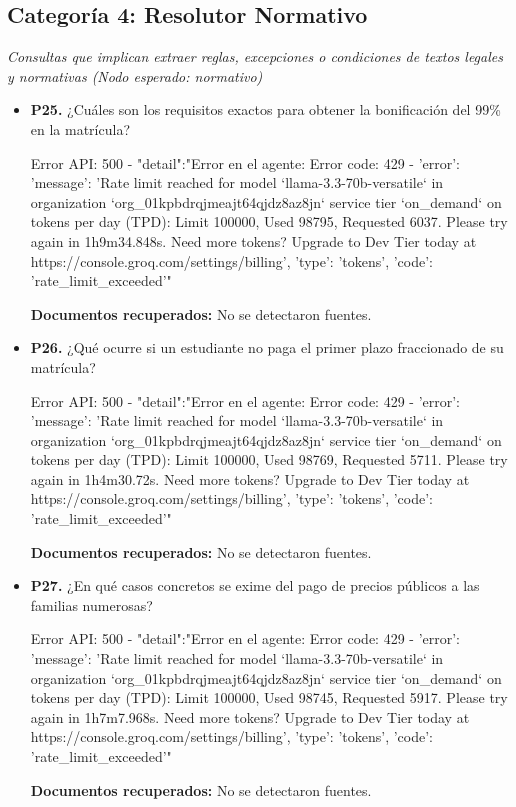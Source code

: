 \documentclass{article}
\begin{document}
\subsection{Categoría 4: Resolutor Normativo}
\textit{Consultas que implican extraer reglas, excepciones o condiciones de textos legales y normativas (Nodo esperado: normativo)}
\begin{itemize}
  \item \textbf{P25.} ¿Cuáles son los requisitos exactos para obtener la bonificación del 99\% en la matrícula? \\
    \begin{respuesta_agente}
      Error API: 500 - {"detail":"Error en el agente: Error code: 429 - {'error': {'message': 'Rate limit reached for model `llama-3.3-70b-versatile` in organization `org_01kpbdrqjmeajt64qjdz8az8jn` service tier `on_demand` on tokens per day (TPD): Limit 100000, Used 98795, Requested 6037. Please try again in 1h9m34.848s. Need more tokens? Upgrade to Dev Tier today at https://console.groq.com/settings/billing', 'type': 'tokens', 'code': 'rate_limit_exceeded'}}"}
    \end{respuesta_agente}
    \vspace{0.2cm}
    \noindent\textbf{Documentos recuperados:} No se detectaron fuentes.

  \item \textbf{P26.} ¿Qué ocurre si un estudiante no paga el primer plazo fraccionado de su matrícula? \\
    \begin{respuesta_agente}
      Error API: 500 - {"detail":"Error en el agente: Error code: 429 - {'error': {'message': 'Rate limit reached for model `llama-3.3-70b-versatile` in organization `org_01kpbdrqjmeajt64qjdz8az8jn` service tier `on_demand` on tokens per day (TPD): Limit 100000, Used 98769, Requested 5711. Please try again in 1h4m30.72s. Need more tokens? Upgrade to Dev Tier today at https://console.groq.com/settings/billing', 'type': 'tokens', 'code': 'rate_limit_exceeded'}}"}
    \end{respuesta_agente}
    \vspace{0.2cm}
    \noindent\textbf{Documentos recuperados:} No se detectaron fuentes.

  \item \textbf{P27.} ¿En qué casos concretos se exime del pago de precios públicos a las familias numerosas? \\
    \begin{respuesta_agente}
      Error API: 500 - {"detail":"Error en el agente: Error code: 429 - {'error': {'message': 'Rate limit reached for model `llama-3.3-70b-versatile` in organization `org_01kpbdrqjmeajt64qjdz8az8jn` service tier `on_demand` on tokens per day (TPD): Limit 100000, Used 98745, Requested 5917. Please try again in 1h7m7.968s. Need more tokens? Upgrade to Dev Tier today at https://console.groq.com/settings/billing', 'type': 'tokens', 'code': 'rate_limit_exceeded'}}"}
    \end{respuesta_agente}
    \vspace{0.2cm}
    \noindent\textbf{Documentos recuperados:} No se detectaron fuentes.


\end{itemize}
\end{document}
